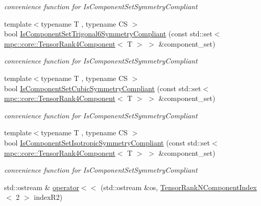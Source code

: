 \begin{DoxyCompactItemize}
\begin{DoxyCompactList}\small\item\em convenience function for Is\+Component\+Set\+Symmetry\+Compliant \end{DoxyCompactList}\item 
{\footnotesize template$<$typename T , typename CS $>$ }\\bool \mbox{\hyperlink{namespacempc_1_1core_affdfa075c30cf1356eb98c6eb625e8f8}{Is\+Component\+Set\+Trigonal6\+Symmetry\+Compliant}} (const std\+::set$<$ \mbox{\hyperlink{namespacempc_1_1core_ac3a232afc7c680d580628e834030482f}{mpc\+::core\+::\+Tensor\+Rank4\+Component}}$<$ T $>$ $>$ \&component\+\_\+set)
\begin{DoxyCompactList}\small\item\em convenience function for Is\+Component\+Set\+Symmetry\+Compliant \end{DoxyCompactList}\item 
{\footnotesize template$<$typename T , typename CS $>$ }\\bool \mbox{\hyperlink{namespacempc_1_1core_a24497694376335a8c2e32fc7b1bd22fd}{Is\+Component\+Set\+Cubic\+Symmetry\+Compliant}} (const std\+::set$<$ \mbox{\hyperlink{namespacempc_1_1core_ac3a232afc7c680d580628e834030482f}{mpc\+::core\+::\+Tensor\+Rank4\+Component}}$<$ T $>$ $>$ \&component\+\_\+set)
\begin{DoxyCompactList}\small\item\em convenience function for Is\+Component\+Set\+Symmetry\+Compliant \end{DoxyCompactList}\item 
{\footnotesize template$<$typename T , typename CS $>$ }\\bool \mbox{\hyperlink{namespacempc_1_1core_a0aee7acb4257605a58b75db9365f8f87}{Is\+Component\+Set\+Isotropic\+Symmetry\+Compliant}} (const std\+::set$<$ \mbox{\hyperlink{namespacempc_1_1core_ac3a232afc7c680d580628e834030482f}{mpc\+::core\+::\+Tensor\+Rank4\+Component}}$<$ T $>$ $>$ \&component\+\_\+set)
\begin{DoxyCompactList}\small\item\em convenience function for Is\+Component\+Set\+Symmetry\+Compliant \end{DoxyCompactList}\item 
std\+::ostream \& \mbox{\hyperlink{namespacempc_1_1core_aa9733db2c8b0b9cb9322fb2de46b09cb}{operator$<$$<$}} (std\+::ostream \&os, \mbox{\hyperlink{classmpc_1_1core_1_1_tensor_rank_n_component_index}{Tensor\+Rank\+N\+Component\+Index}}$<$ 2 $>$ index\+R2)

\end{DoxyCompactItemize}

